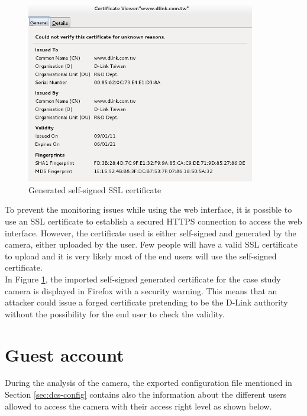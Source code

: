 \begin{figure}[h]
  \centering
  \includegraphics[width=10cm]{images/dcs-ssl.png}
  \caption{Generated self-signed SSL certificate}
  \label{fig:dcs-ssl}
\end{figure}

To prevent the monitoring issues while using the web interface, it is possible to use an SSL certificate to establish a secured HTTPS connection to access the web interface.
However, the certificate used is either self-signed and generated by the camera, either uploaded by the user.
Few people will have a valid SSL certificate to upload and it is very likely most of the end users will use the self-signed certificate.\\

In Figure \ref{fig:dcs-ssl}, the imported self-signed generated certificate for the case study camera is displayed in Firefox with a security warning.
This means that an attacker could issue a forged certificate pretending to be the D-Link authority without the possibility for the end user to check the validity.

\section{Guest account}
\label{sec:dcs-guest}

During the analysis of the camera, the exported configuration file mentioned in Section \ref{sec:dcs-config} contains also the information about the different users allowed to access the camera with their access right level as shown below.

